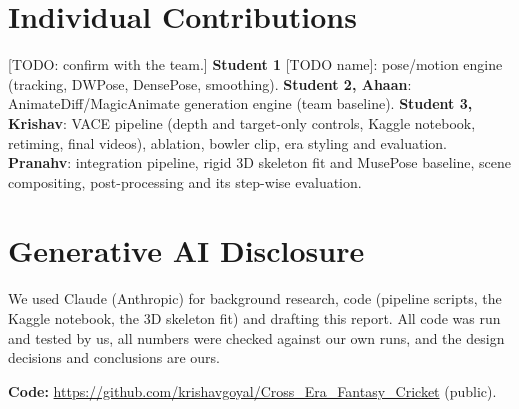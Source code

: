 \section{Individual Contributions}
[TODO: confirm with the team.] \textbf{Student 1} [TODO name]: pose/motion engine (tracking, DWPose, DensePose,
smoothing). \textbf{Student 2, Ahaan}: AnimateDiff/MagicAnimate generation engine (team baseline).
\textbf{Student 3, Krishav}: VACE pipeline (depth and target-only controls, Kaggle notebook, retiming, final videos),
ablation, bowler clip, era styling and evaluation. \textbf{Pranahv}: integration pipeline, rigid 3D skeleton fit and
MusePose baseline, scene compositing, post-processing and its step-wise evaluation.

\section{Generative AI Disclosure}
We used Claude (Anthropic) for background research, code (pipeline scripts, the Kaggle notebook, the 3D skeleton fit)
and drafting this report. All code was run and tested by us, all numbers were checked against our own runs, and the
design decisions and conclusions are ours.

\textbf{Code:} \url{https://github.com/krishavgoyal/Cross_Era_Fantasy_Cricket} (public).

\small



